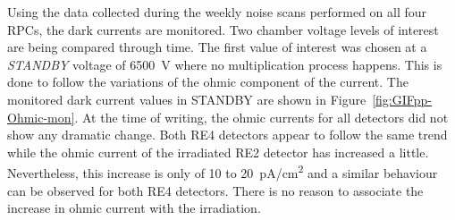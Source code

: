 	Using the data collected during the weekly noise scans performed on all four RPCs, the dark currents are monitored. Two chamber voltage levels of interest are being compared through time. The first value of interest was chosen at a \textit{STANDBY} voltage of \SI{6500}{V} where no multiplication process happens. This is done to follow the variations of the ohmic component of the current. The monitored dark current values in STANDBY are shown in Figure~\ref{fig:GIFpp-Ohmic-mon}. At the time of writing, the ohmic currents for all detectors did not show any dramatic change. Both RE4 detectors appear to follow the same trend while the ohmic current of the irradiated RE2 detector has increased a little. Nevertheless, this increase is only of 10 to \SI{20}{pA/cm^2} and a similar behaviour can be observed for both RE4 detectors. There is no reason to associate the increase in ohmic current with the irradiation.

